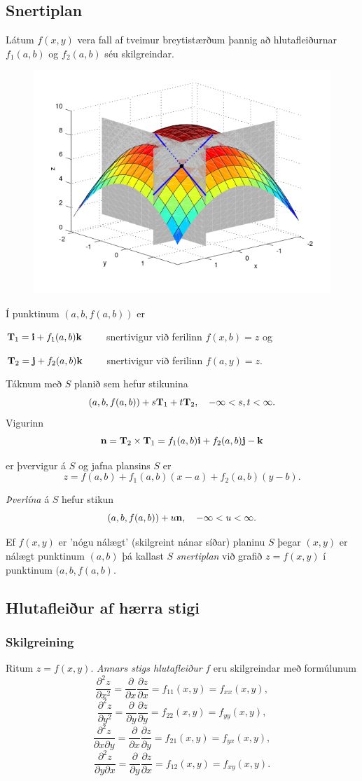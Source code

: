 \subsection{Snertiplan}
  Látum $f(x,y)$ vera fall af tveimur breytistærðum þannig að hlutafleiðurnar $f_1(a,b)$ og $f_2(a,b)$ séu skilgreindar.
  \begin{figure}
           \centering
            \includegraphics[width=0.6\linewidth]{bothpart.png}
	\caption*{}
    \end{figure}
    Í punktinum $(a,b,f(a,b))$ er 
    
    $\mbox{${\bf T}$}_1 = \mbox{${\bf i}$} + f_1(a,b)\mbox{${\bf k}$}\qquad$ snertivigur við ferilinn $f(x,b) = z$ og
    
    $\mbox{${\bf T}$}_2 = \mbox{${\bf j}$} + f_2(a,b)\mbox{${\bf k}$}\qquad$ snertivigur við ferilinn $f(a,y) = z$.



 Táknum með $S$ planið sem hefur stikunina
$$(a,b,f(a,b))+s\mbox{${\bf T}$}_1+t\mbox{${\bf T}$}_2, \quad -\infty < s,t < \infty.$$
Vigurinn 
$$\mbox{${\bf n}$}=\mbox{${\bf T}$}_2\times \mbox{${\bf T}$}_1=f_1(a,b)\mbox{${\bf i}$}+f_2(a,b)\mbox{${\bf j}$}-\mbox{${\bf k}$}$$ 

er þvervigur á $S$ og jafna plansins $S$ er
$$z=f(a,b)+f_1(a,b)(x-a)+f_2(a,b)(y-b).$$

\emph{Þverlína} á $S$ hefur stikun
$$(a,b,f(a,b)) + u \mbox{${\bf n}$}, \quad -\infty < u < \infty.$$

Ef $f(x,y)$ er 'nógu nálægt' (skilgreint nánar síðar) planinu $S$ þegar $(x,y)$ er nálægt punktinum $(a,b)$ þá kallast $S$ \emph{snertiplan} við grafið $z=f(x,y)$ í punktinum $(a,b,f(a,b)$.


\subsection{Hlutafleiður af hærra stigi}
 \subsubsection{Skilgreining }
  Ritum $z=f(x,y)$.  {\em Annars stigs
  hlutafleiður} $f$ eru skilgreindar með formúlunum
$$\frac{\partial^2 z}{\partial x^2}=
\frac{\partial}{\partial x} \frac{\partial z}{\partial x}
=f_{11}(x,y)=f_{xx}(x,y),$$
$$\frac{\partial^2 z}{\partial y^2}=
\frac{\partial}{\partial y} \frac{\partial z}{\partial y}
=f_{22}(x,y)=f_{yy}(x,y),$$
$$\frac{\partial^2 z}{\partial x\partial y}=
\frac{\partial}{\partial x} \frac{\partial z}{\partial y}
=f_{21}(x,y)=f_{yx}(x,y),$$
$$\frac{\partial^2 z}{\partial y\partial x}=
\frac{\partial}{\partial y} \frac{\partial z}{\partial x}
=f_{12}(x,y)=f_{xy}(x,y).$$

